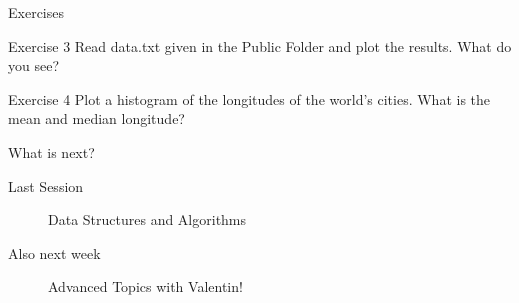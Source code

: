 \documentclass{beamer}
\begin{document}
\begin{frame}[fragile]{Exercises}
	\begin{block}{Exercise 3}
		Read data.txt given in the Public Folder and plot the results.
		What do you see?
	\end{block}
	\begin{block}{Exercise 4}
		Plot a histogram of the longitudes of the world's cities. What is the mean and median longitude?
\end{block}

\end{frame}


\begin{frame}{What is next?}
  \begin{description}
    \item[Last Session] Data Structures and Algorithms
    \item[Also next week] Advanced Topics with Valentin!
  \end{description}
\end{frame}
%	
%	
%	
%	
\end{document}
